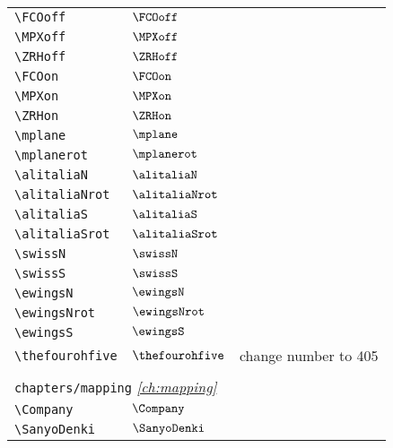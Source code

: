 \begin{longtable}{lll}
 {\color[rgb]{0.5,0.5,0.5}\texttt{\textbackslash FCOoff}} & $\FCOoff$ & \\ 
 {\color[rgb]{0.5,0.5,0.5}\texttt{\textbackslash MPXoff}} & $\MPXoff$ & \\ 
 {\color[rgb]{0.5,0.5,0.5}\texttt{\textbackslash ZRHoff}} & $\ZRHoff$ & \\ 
 {\color[rgb]{0.5,0.5,0.5}\texttt{\textbackslash FCOon}} & $\FCOon$ & \\ 
 {\color[rgb]{0.5,0.5,0.5}\texttt{\textbackslash MPXon}} & $\MPXon$ & \\ 
 {\color[rgb]{0.5,0.5,0.5}\texttt{\textbackslash ZRHon}} & $\ZRHon$ & \\ 
 {\color[rgb]{0.5,0.5,0.5}\texttt{\textbackslash mplane}} & $\mplane$ & \\ 
 {\color[rgb]{0.5,0.5,0.5}\texttt{\textbackslash mplanerot}} & $\mplanerot$ & \\ 
 {\color[rgb]{0.5,0.5,0.5}\texttt{\textbackslash alitaliaN}} & $\alitaliaN$ & \\ 
 {\color[rgb]{0.5,0.5,0.5}\texttt{\textbackslash alitaliaNrot}} & $\alitaliaNrot$ & \\ 
 {\color[rgb]{0.5,0.5,0.5}\texttt{\textbackslash alitaliaS}} & $\alitaliaS$ & \\ 
 {\color[rgb]{0.5,0.5,0.5}\texttt{\textbackslash alitaliaSrot}} & $\alitaliaSrot$ & \\ 
 {\color[rgb]{0.5,0.5,0.5}\texttt{\textbackslash swissN}} & $\swissN$ & \\ 
 {\color[rgb]{0.5,0.5,0.5}\texttt{\textbackslash swissS}} & $\swissS$ & \\ 
 {\color[rgb]{0.5,0.5,0.5}\texttt{\textbackslash ewingsN}} & $\ewingsN$ & \\ 
 {\color[rgb]{0.5,0.5,0.5}\texttt{\textbackslash ewingsNrot}} & $\ewingsNrot$ & \\ 
 {\color[rgb]{0.5,0.5,0.5}\texttt{\textbackslash ewingsS}} & $\ewingsS$ & \\ 
 {\color[rgb]{0.5,0.5,0.5}\texttt{\textbackslash thefourohfive}} & $\thefourohfive$ &  change number to 405\\ 
  &  & \\ 
 \multicolumn{3}{l}{{\color[rgb]{0.5,0.5,0.5}\texttt{chapters/mapping}} \emph{\cref{ch:mapping}}}\\ 
 \hline
{\color[rgb]{0.5,0.5,0.5}\texttt{\textbackslash Company}} & $\Company$ & \\ 
 {\color[rgb]{0.5,0.5,0.5}\texttt{\textbackslash SanyoDenki}} & $\SanyoDenki$ & \\ 

\end{longtable}
